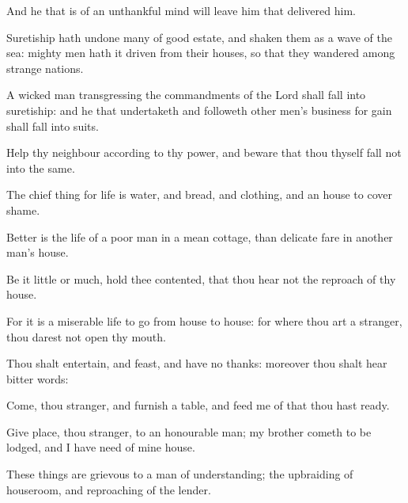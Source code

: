 {\par }{\PP {}And he that is of an unthankful mind will leave him
{} that delivered him.
\par }{\PP {}Suretiship hath undone many of good estate, and shaken them as a wave of the sea: mighty men hath it driven from their houses, so that they wandered among strange nations.
\par }{\PP {}A wicked man transgressing the commandments of the Lord shall fall into suretiship: and he that undertaketh and followeth other men’s business for gain shall fall into suits.
\par }{\PP {}Help thy neighbour according to thy power, and beware that thou thyself fall not into the same.
\par }{\PP {}The chief thing for life is water, and bread, and clothing, and an house to cover shame.
\par }{\PP {}Better is the life of a poor man in a mean cottage, than delicate fare in another man’s house.
\par }{\PP {}Be it little or much, hold thee contented, that thou hear not the reproach of thy house.
\par }{\PP {}For it is a miserable life to go from house to house: for where thou art a stranger, thou darest not open thy mouth.
\par }{\PP {}Thou shalt entertain, and feast, and have no thanks: moreover thou shalt hear bitter words:
\par }{\PP {}Come, thou stranger, and furnish a table, and feed me of that thou hast ready.
\par }{\PP {}Give place, thou stranger, to an honourable man; my brother cometh to be lodged, and I have need of mine house.
\par }{\PP {}These things are grievous to a man of understanding; the upbraiding of houseroom, and reproaching of the lender.

}
